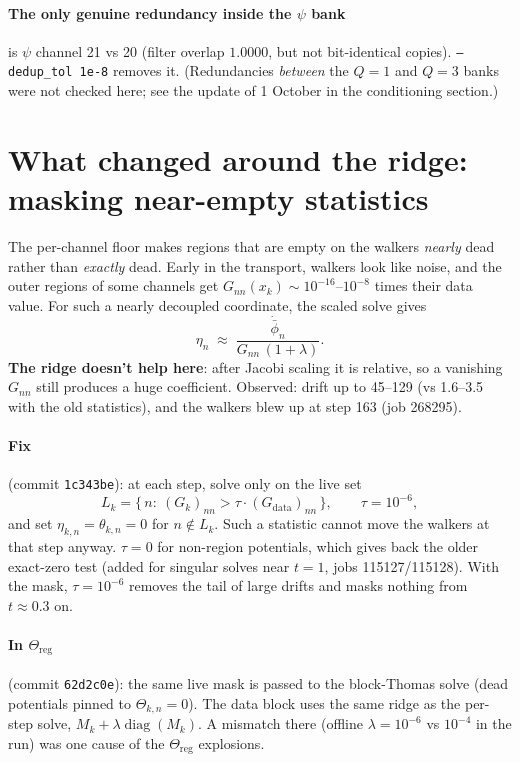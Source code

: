 \documentclass[11pt]{article}
\newcommand{\code}[1]{\texttt{#1}}
\begin{document}
\paragraph{The only genuine redundancy inside the $\psi$ bank} is $\psi$ channel 21 vs 20 (filter
overlap $1.0000$, but not bit-identical copies). \code{--dedup\_tol 1e-8} removes it. (Redundancies
\emph{between} the $Q=1$ and $Q=3$ banks were not checked here; see the update of 1 October in the
conditioning section.)

\section{What changed around the ridge: masking near-empty statistics}

The per-channel floor makes regions that are empty on the walkers \emph{nearly} dead
rather than \emph{exactly} dead. Early in the transport, walkers look like noise, and
the outer regions of some channels get $G_{nn}(x_k) \sim 10^{-16}$--$10^{-8}$ times
their data value. For such a nearly decoupled coordinate, the scaled solve gives
\[
  \eta_n \;\approx\; \frac{\dot{\bar\phi}_n}{G_{nn}\,(1+\lambda)} .
\]
\textbf{The ridge doesn't help here}: after Jacobi scaling it is relative, so a
vanishing $G_{nn}$ still produces a huge coefficient. Observed: drift up to 45--129
(vs 1.6--3.5 with the old statistics), and the walkers blew up at step 163 (job 268295).

\paragraph{Fix} (commit \code{1c343be}): at each step, solve only on the live set
\[
  L_k = \big\{\,n:\ (G_k)_{nn} > \tau\cdot (G_{\text{data}})_{nn}\,\big\},\qquad \tau = 10^{-6},
\]
and set $\eta_{k,n} = \theta_{k,n} = 0$ for $n\notin L_k$. Such a statistic cannot move the
walkers at that step anyway. $\tau=0$ for non-region potentials, which gives back the
older exact-zero test (added for singular solves near $t=1$, jobs 115127/115128).
With the mask, $\tau = 10^{-6}$ removes the tail of large drifts and masks nothing from $t\approx0.3$ on.

\paragraph{In $\Theta_{\text{reg}}$} (commit \code{62d2c0e}): the same live mask is
passed to the block-Thomas solve (dead potentials pinned to $\Theta_{k,n}=0$). The data
block uses the same ridge as the per-step solve, $M_k + \lambda\operatorname{diag}(M_k)$.
A mismatch there (offline $\lambda=10^{-6}$ vs $10^{-4}$ in the run) was one cause of
the $\Theta_{\text{reg}}$ explosions.
\end{document}
